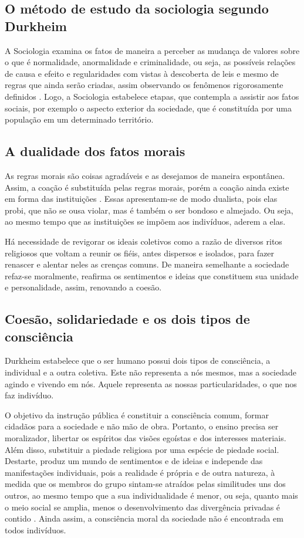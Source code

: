 \subsection{O método de estudo da sociologia segundo Durkheim}

A Sociologia examina os fatos de maneira a perceber as mudança de valores sobre o que é normalidade, anormalidade e criminalidade, ou seja, as possíveis relações de causa e efeito e regularidades com vistas à descoberta de leis e mesmo de regras que ainda serão criadas, assim observando os fenômenos rigorosamente definidos \cite{quintaneiro2003toque}. 
Logo, a Sociologia estabelece etapas, que contempla a assistir aos fatos sociais, por exemplo o aspecto exterior da sociedade, que é constituída por uma população em um determinado território.


\subsection{A dualidade dos fatos morais}

As regras morais são coisas agradáveis e as desejamos de maneira espontânea.
Assim, a coação é substituída pelas regras morais, porém a coação ainda existe em forma das instituições \cite{quintaneiro2003toque}.
Essas apresentam-se de modo dualista, pois elas probi, que não se ousa violar, mas é também o ser bondoso e almejado. 
Ou seja,  ao mesmo tempo que as instituições se impõem aos indivíduos, aderem a elas.

Há necessidade de revigorar os ideais coletivos como a razão de diversos ritos religiosos que voltam a reunir os fiéis, antes dispersos e isolados, para fazer renascer e alentar neles as crenças comuns.
De maneira semelhante a sociedade  refaz-se moralmente, reafirma os sentimentos e ideias que constituem sua unidade e personalidade, assim, renovando a coesão.


\subsection{Coesão, solidariedade e os dois tipos de consciência}

Durkheim estabelece que o ser humano possui dois tipos de consciência, a individual e a outra coletiva. 
Este não representa a nós mesmos, mas a sociedade agindo e vivendo em nós. 
Aquele representa as nossas particularidades, o que nos faz indivíduo.

O objetivo da instrução pública é constituir a consciência comum, formar cidadãos para a sociedade e não mão de obra. 
Portanto, o ensino precisa ser moralizador, libertar os espíritos das visões egoístas e dos interesses materiais.
Além disso, substituir a piedade religiosa por uma espécie de piedade social.
Destarte, produz um mundo de sentimentos e de ideias e independe das manifestações individuais, pois a realidade é própria e de outra natureza, à medida que os membros do grupo sintam-se atraídos pelas similitudes uns dos outros, ao mesmo tempo que a sua individualidade é menor, ou seja, quanto mais o meio social se amplia, menos o desenvolvimento das divergência privadas é contido \cite{quintaneiro2003toque}. 
Ainda assim, a consciência moral da sociedade não é encontrada em todos indivíduos.


